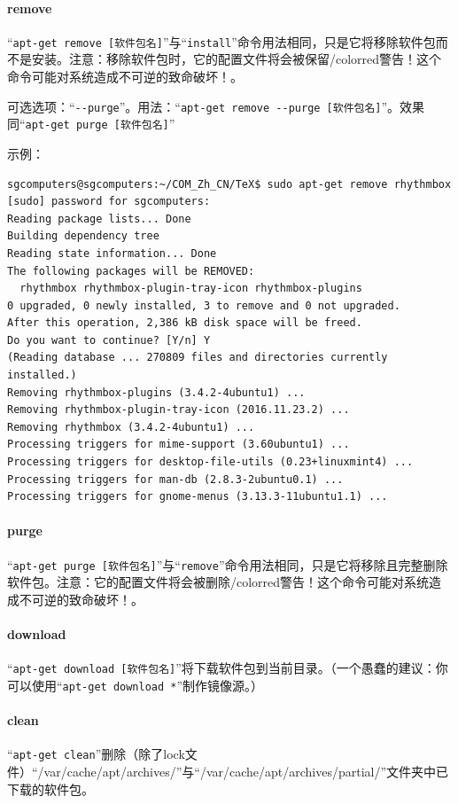 \paragraph{remove}
“\verb|apt-get remove [软件包名]|”与“\verb|install|”命令用法相同，只是它将移除软件包而不是安装。注意：移除软件包时，它的配置文件将会被保留{/color{red}{警告！这个命令可能对系统造成不可逆的致命破坏！}}。\par
可选选项：“\verb|--purge|”。用法：“\verb|apt-get remove --purge [软件包名]|”。效果同“\verb|apt-get purge [软件包名]|”\par
示例：
\begin{verbatim}
sgcomputers@sgcomputers:~/COM_Zh_CN/TeX$ sudo apt-get remove rhythmbox
[sudo] password for sgcomputers: 
Reading package lists... Done
Building dependency tree       
Reading state information... Done
The following packages will be REMOVED:
  rhythmbox rhythmbox-plugin-tray-icon rhythmbox-plugins
0 upgraded, 0 newly installed, 3 to remove and 0 not upgraded.
After this operation, 2,386 kB disk space will be freed.
Do you want to continue? [Y/n] Y
(Reading database ... 270809 files and directories currently installed.)
Removing rhythmbox-plugins (3.4.2-4ubuntu1) ...
Removing rhythmbox-plugin-tray-icon (2016.11.23.2) ...
Removing rhythmbox (3.4.2-4ubuntu1) ...
Processing triggers for mime-support (3.60ubuntu1) ...
Processing triggers for desktop-file-utils (0.23+linuxmint4) ...
Processing triggers for man-db (2.8.3-2ubuntu0.1) ...
Processing triggers for gnome-menus (3.13.3-11ubuntu1.1) ...
\end{verbatim}
\paragraph{purge}
“\verb|apt-get purge [软件包名]|”与“\verb|remove|”命令用法相同，只是它将移除且完整删除软件包。注意：它的配置文件将会被删除{/color{red}{警告！这个命令可能对系统造成不可逆的致命破坏！}}。\par
\paragraph{ download}
“\verb|apt-get download [软件包名]|”将下载软件包到当前目录。（一个愚蠢的建议：你可以使用“\verb|apt-get download *|”制作镜像源。{\color{red}{不要这么做。}}）
\paragraph{clean}
“\verb|apt-get clean|”删除（除了lock文件）“/var/cache/apt/archives/”与“/var/cache/apt/archives/partial/”文件夹中已下载的软件包。
